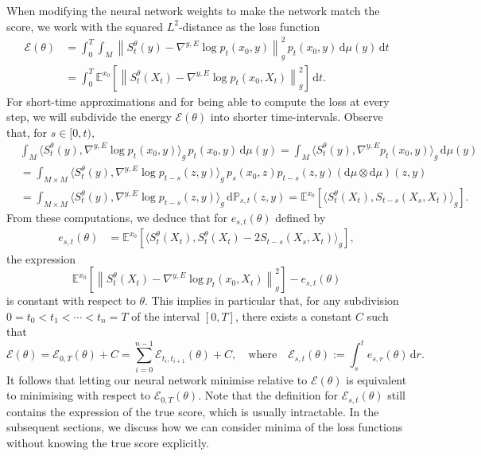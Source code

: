 \documentclass[10pt]{amsart}
\theoremstyle{remark}
\newcommand{\scrE}{\mathscr{E}}
\newcommand{\E}{\mathbb{E}}
\newcommand{\dd}{\,{\mathrm d}}
\newcommand{\db}{{\mathrm d}}
\numberwithin{equation}{section}
\begin{document}
When modifying the neural network weights to make the network match the score, we work with the squared $L^2$-distance as the loss function
\begin{align*}
    \scrE(\theta)  & =\int_0^T \int_{M} \left\| S^{\theta}_t(y)- \nabla^{y,E} \log p_{t}(x_0,y)\right\|_g^2\, p_t(x_0,y) \dd \mu(y) \dd t \\
    & = \int_0^T \mathbb{E}^{x_0}\left[\left\| S^{\theta}_t(X_t)- \nabla^{y,E} \log p_{t}(x_0,X_t)\right\|_g^2 \right] \dd t.
\end{align*}
For short-time approximations and for being able to compute the loss at every step, we will subdivide the energy $\scrE(\theta)$ into shorter time-intervals.
Observe that, for $s\in[0,t)$,
\begin{align*}
& \int_M \langle S_t^{\theta}(y) , \nabla^{y,E} \log p_{t}(x_0,y) \rangle_g \, p_t(x_0, y)\dd\mu(y) =  \int_M \langle S_t^{\theta}(y) , \nabla^{y,E} p_{t}(x_0,y) \rangle_g \dd\mu(y) \\
& = \int_{M \times M} \langle S_t^{\theta}(y) , \nabla^{y,E} \log p_{t-s}(z,y) \rangle_g \, p_{s}(x_0,z) p_{t-s}(z,y) (\db\mu \otimes \db\mu)(z,y)  \\
& =\int_{M \times M} \langle S_t^{\theta}(y) , \nabla^{y,E} \log p_{t-s}(z,y) \rangle_g \dd \mathbb{P}_{s,t}(z,y)  = \E^{x_0}\left[\langle S^\theta_t(X_t), S_{t-s}(X_s, X_t) \rangle_g \right].
\end{align*}
From these computations, we deduce that for $e_{s,t}(\theta)$ defined by
\begin{align} \label{est} 
    e_{s,t}(\theta) &  = \E^{x_0}\left[\langle S^\theta_t(X_t), S^\theta_t(X_t) - 2 S_{t-s}(X_s, X_t) \rangle_g \right],
\end{align}
the expression
$$\mathbb{E}^{x_0}\left[\left\| S^{\theta}_t(X_t)- \nabla^{y,E} \log p_{t}(x_0,X_t)\right\|_g^2 \right] -e_{s,t}(\theta)$$
is constant with respect to $\theta$. This implies in particular that, for any subdivision $0=t_0 < t_{1} < \cdots < t_n= T$ of the interval $[0,T]$, there exists a constant $C$ such that
$$\scrE(\theta) = \scrE_{0,T}(\theta) + C = \sum_{i=0}^{n-1} \scrE_{t_{i},t_{i+1}}(\theta) + C,
\quad\text{where}\quad \scrE_{s,t}(\theta) := \int_s^t e_{s,r}(\theta) \dd r.$$
It follows that letting our neural network minimise relative to $\scrE(\theta)$ is equivalent to minimising with respect to $\scrE_{0,T}(\theta)$. Note that the definition for $\scrE_{s,t}(\theta)$ still contains the expression of the true score, which is usually intractable. In the subsequent sections, we discuss how we can consider minima of the loss functions without knowing the true score explicitly.
\end{document}

